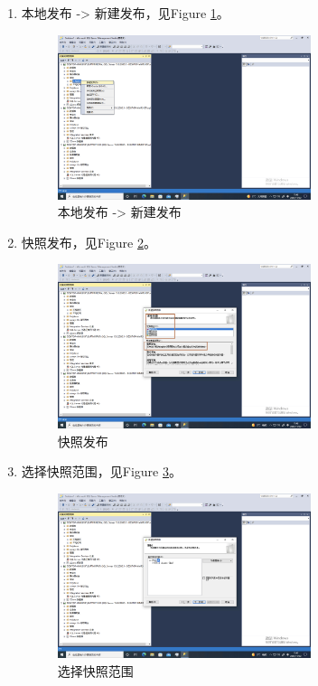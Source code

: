 \documentclass[onecolumn,oneside]{BUPTHomework}
\begin{document}
  \begin{enumerate}
    
  \item 本地发布 -> 新建发布，见Figure \ref{pic18}。
  
  \newpage
  
  \begin{figure}[h]
    \centering
    \includegraphics[width=0.70\textwidth]{image/pic18.png}
    \caption{本地发布 -> 新建发布}
    \label{pic18}
  \end{figure}

  \item 快照发布，见Figure \ref{pic19}。

  \begin{figure}[h]
    \centering
    \includegraphics[width=0.70\textwidth]{image/pic19.png}
    \caption{快照发布}
    \label{pic19}
  \end{figure}

  \item 选择快照范围，见Figure \ref{pic20}。
  
  \newpage

  \begin{figure}[h]
    \centering
    \includegraphics[width=0.70\textwidth]{image/pic20.png}
    \caption{选择快照范围}
    \label{pic20}
  \end{figure}


\end{enumerate}
\end{document}
